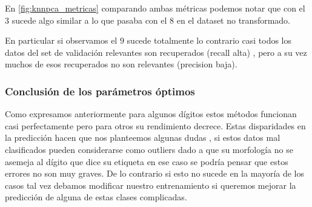 En \ref{fig:knnpca_metricas} comparando ambas métricas podemos notar que con el $3$ sucede algo similar a lo que pasaba con el $8$ en el dataset no transformado.

En particular si observamos el $9$ sucede totalmente lo contrario casi todos los datos del set de validación relevantes son recuperados (recall alta) , pero a su vez muchos de esos recuperados no son relevantes (precision baja).




\subsubsection{Conclusión de los parámetros óptimos}


Como expresamos anteriormente para algunos dígitos estos métodos funcionan casi perfectamente pero para otros su rendimiento decrece. Estas disparidades en la predicción hacen que nos planteemos algunas dudas , si estos datos mal clasificados pueden  considerarse como outliers dado a que su morfología no se asemeja al dígito que dice su etiqueta en ese caso se podría pensar que estos errores no son muy graves. De lo contrario si esto no sucede en la mayoría de los casos tal vez debamos modificar nuestro entrenamiento si queremos mejorar la predicción de alguna de estas clases complicadas.

